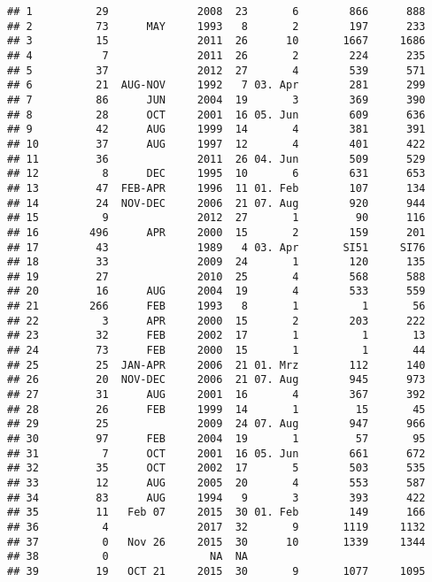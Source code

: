 \documentclass[
  english,
  man]{apa6}
\begin{document}
\begin{verbatim}
## 1          29              2008  23       6        866      888
## 2          73      MAY     1993   8       2        197      233
## 3          15              2011  26      10       1667     1686
## 4           7              2011  26       2        224      235
## 5          37              2012  27       4        539      571
## 6          21  AUG-NOV     1992   7 03. Apr        281      299
## 7          86      JUN     2004  19       3        369      390
## 8          28      OCT     2001  16 05. Jun        609      636
## 9          42      AUG     1999  14       4        381      391
## 10         37      AUG     1997  12       4        401      422
## 11         36              2011  26 04. Jun        509      529
## 12          8      DEC     1995  10       6        631      653
## 13         47  FEB-APR     1996  11 01. Feb        107      134
## 14         24  NOV-DEC     2006  21 07. Aug        920      944
## 15          9              2012  27       1         90      116
## 16        496      APR     2000  15       2        159      201
## 17         43              1989   4 03. Apr       SI51     SI76
## 18         33              2009  24       1        120      135
## 19         27              2010  25       4        568      588
## 20         16      AUG     2004  19       4        533      559
## 21        266      FEB     1993   8       1          1       56
## 22          3      APR     2000  15       2        203      222
## 23         32      FEB     2002  17       1          1       13
## 24         73      FEB     2000  15       1          1       44
## 25         25  JAN-APR     2006  21 01. Mrz        112      140
## 26         20  NOV-DEC     2006  21 07. Aug        945      973
## 27         31      AUG     2001  16       4        367      392
## 28         26      FEB     1999  14       1         15       45
## 29         25              2009  24 07. Aug        947      966
## 30         97      FEB     2004  19       1         57       95
## 31          7      OCT     2001  16 05. Jun        661      672
## 32         35      OCT     2002  17       5        503      535
## 33         12      AUG     2005  20       4        553      587
## 34         83      AUG     1994   9       3        393      422
## 35         11   Feb 07     2015  30 01. Feb        149      166
## 36          4              2017  32       9       1119     1132
## 37          0   Nov 26     2015  30      10       1339     1344
## 38          0                NA  NA                            
## 39         19   OCT 21     2015  30       9       1077     1095

\end{verbatim}
\end{document}
